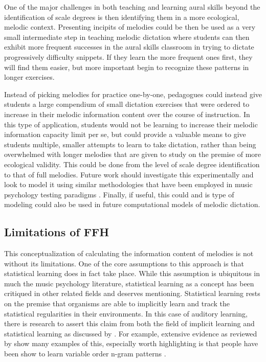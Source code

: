 \documentclass[]{book}
\begin{document}
One of the major challenges in both teaching and learning aural skills beyond the identification of scale degrees is then identifying them in a more ecological, melodic context.
Presenting incipits of melodies could be then be used as a very small intermediate step in teaching melodic dictation where students can then exhibit more frequent successes in the aural skills classroom in trying to dictate progressively difficulty snippets.
If they learn the more frequent ones first, they will find them easier, but more important begin to recognize these patterns in longer exercises.

Instead of picking melodies for practice one-by-one, pedagogues could instead give students a large compendium of small dictation exercises that were ordered to increase in their melodic information content over the course of instruction.
In this type of application, students would not be learning to increase their melodic information capacity limit per se, but could provide a valuable means to give students multiple, smaller attempts to learn to take dictation, rather than being overwhelmed with longer melodies that are given to study on the premise of more ecological validity.
This could be done from the level of scale degree identification to that of full melodies.
Future work should investigate this experimentally and look to model it using similar methodologies that have been employed in music psychology testing paradigms \citep{harrisonApplyingModernPsychometric2017, wolfGradesReflectDevelopment2014}.
Finally, if useful, this could and is type of modeling could also be used in future computational models of melodic dictation.

\hypertarget{limitations-of-ffh}{%
\subsection{Limitations of FFH}\label{limitations-of-ffh}}

This conceptualization of calculating the information content of melodies is not without its limitations.
One of the core assumptions to this approach is that statistical learning does in fact take place.
While this assumption is ubiquitous in much the music psychology literature, statistical learning as a concept has been critiqued in other related fields and deserves mentioning.
Statistical learning rests on the premise that organisms are able to implicitly learn and track the statistical regularities in their environments.
In this case of auditory learning, there is research to assert this claim from both the field of implicit learning and statistical learning as discussed by \citet{perruchetImplicitLearningStatistical2006}.
For example, extensive evidence as reviewed by \citet{cleeremansComputationalModelsImplicit2008} show many examples of this, especially worth highlighting is that people have been show to learn variable order n-gram patterns \citep{remillardImplicitLearningFirst2001}.
\end{document}
